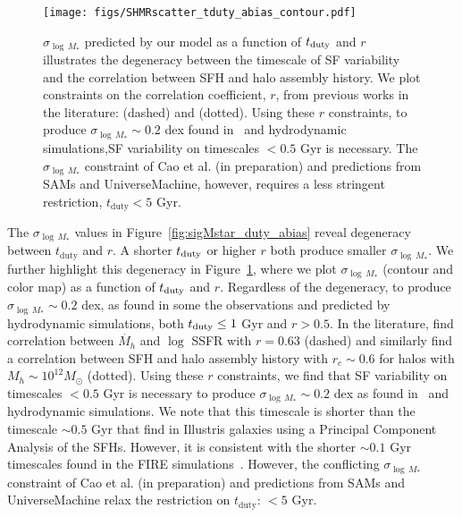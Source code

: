 \documentclass[12pt, letterpaper, preprint, tighten]{aastex62}
\begin{document}
\begin{figure}
\begin{center}
\texttt{[image: figs/SHMRscatter\_tduty\_abias\_contour.pdf]}
    \caption{$\sigma_{\log\,M_*}$ predicted by our model as a function of 
    $t_{\rm duty}$ and $r$ illustrates the degeneracy between the timescale of 
    SF variability and the correlation between SFH and halo assembly history. 
    We plot constraints on the correlation coefficient, $r$, from previous
    works in the literature: \cite{tinker2018b} (dashed) and \cite{behroozi2018} 
    (dotted). Using these $r$ constraints, to produce $\sigma_{\log\,M_*} \sim 0.2$ dex
    found in~\cite{more2011, leauthaud2012, reddick2013, tinker2013, zu2015} and 
    hydrodynamic simulations,SF variability on timescales $< 0.5$ Gyr is necessary.
    The $\sigma_{\log\,M_*}$ constraint of Cao et al. (in preparation) and predictions 
    from SAMs and {\sc UniverseMachine}, however, requires a less stringent 
    restriction, $t_\mathrm{duty} < 5$ Gyr. 
    }
\label{fig:r_tduty}
\end{center}
\end{figure}

The $\sigma_{\log\,M_*}$ values in Figure~\ref{fig:sigMstar_duty_abias} 
reveal degeneracy between $t_\mathrm{duty}$ and $r$. A shorter
$t_{\rm duty}$ or higher $r$ both produce smaller $\sigma_{\log\,M_*}$. 
We further highlight this degeneracy in Figure~\ref{fig:r_tduty}, where 
we plot $\sigma_{\log\,M_*}$ (contour and color map) as a function of 
$t_{\rm duty}$ and $r$. Regardless of the degeneracy, to produce 
$\sigma_{\log\,M_*} \sim 0.2$ dex, as found in some the observations 
and predicted by hydrodynamic simulations, both $t_{\rm duty} \leq 1$ Gyr 
and $r > 0.5$. In the literature, \cite{tinker2018b} find correlation 
between $\dot{M_h}$ and $\log$ SSFR with $r = 0.63$ (dashed) and 
\cite{behroozi2018} similarly find a correlation between SFH and halo 
assembly history with $r_c \sim 0.6$ for halos with $M_h \sim 10^{12}M_\odot$ 
(dotted). Using these $r$ constraints, we find that SF variability on 
timescales $< 0.5$ Gyr is necessary to produce $\sigma_{\log\,M_*} \sim 0.2$ dex
as found in~\cite{more2011, leauthaud2012, reddick2013, tinker2013, zu2015} 
and hydrodynamic simulations. We note that this timescale is shorter than 
the timescale $\sim 0.5$ Gyr that \cite{sparre2015} find in Illustris galaxies 
using a Principal Component Analysis of the SFHs. However, it is consistent with 
the shorter $\sim 0.1$ Gyr timescales found in the FIRE simulations~\citep{hopkins2014, sparre2017}. 
However, the conflicting $\sigma_{\log\,M_*}$ constraint of Cao et al. (in preparation) and 
predictions from SAMs and {\sc UniverseMachine} relax the restriction on 
$t_\mathrm{duty}$: $< 5$ Gyr. 
\end{document}
